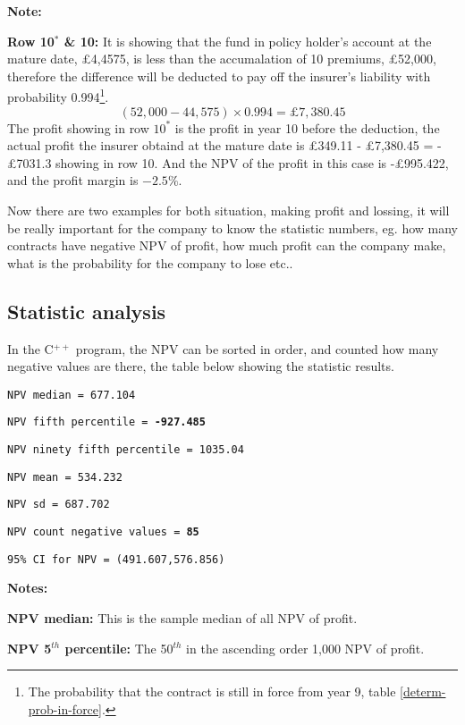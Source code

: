 \documentclass{report}
\begin{document}
\textbf{Note:}


\textbf{Row 10$^*$ \& 10:} It is showing that the fund in policy holder's account at the mature date, \pounds 4,4575, is less than the accumalation of 10 premiums, \pounds 52,000, therefore the difference will be deducted to pay off the insurer's liability with probability 0.994\footnote{The probability that the contract is still in force from year 9, table \ref{determ-prob-in-force}.}. 
\[
(52,000- 44,575)\times 0.994= \pounds 7,380.45 
\]
The profit showing in row $10^*$ is the profit in year 10 before the deduction, the actual profit the insurer obtaind at the mature date is \pounds349.11 - \pounds7,380.45 = -\pounds 7031.3 showing in row 10. And the NPV of the profit in this case is -\pounds995.422, and the profit margin is $-2.5\%$.



Now there are two examples for both situation, making profit and lossing, it will be really important for the company to know the statistic numbers, eg. how many contracts have negative NPV of profit, how much profit can the company make, what is the probability for the company to lose etc..

\subsection{Statistic analysis}

In the C$^{++}$ program, the NPV can be sorted in order, and counted how many negative values are there, the table below showing the statistic results. 

\texttt{NPV median = 677.104}

{\renewcommand\baselinestretch{1}\selectfont


\texttt{NPV fifth percentile = \textbf{-927.485}}

\texttt{NPV ninety fifth percentile = 1035.04}

\texttt{NPV mean = 534.232}

\texttt{NPV sd = 687.702}

\texttt{NPV count negative values = \textbf{85}}

\texttt{95\% CI for NPV = (491.607,576.856)}
\par}

\textbf{Notes:} 

\textbf{NPV median:} This is the sample median of all NPV of profit.

\textbf{NPV 5$^{th}$ percentile:} The 50$^{th}$ in the ascending order 1,000 NPV of profit.
\end{document}
